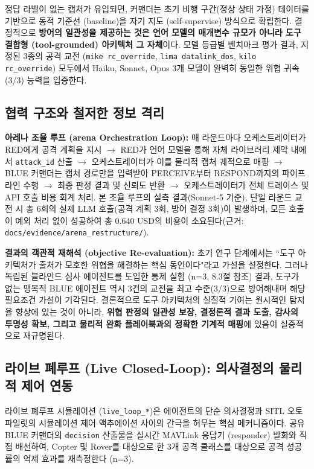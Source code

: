 정답 라벨이 없는 캡처가 유입되면, 커맨더는 초기 비행 구간(정상 상태 가정) 데이터를 기반으로 동적 기준선 (baseline)을 자기 지도 (self-supervise) 방식으로 확립한다. 결정적으로 \textbf{방어의 일관성을 제공하는 것은 언어 모델의 매개변수 규모가 아니라 도구 결합형 (tool-grounded) 아키텍처 그 자체}이다. 모델 등급별 벤치마크 평가 결과, 지정된 3종의 공격 교전 (\texttt{mike rc\_override}, \texttt{lima datalink\_dos}, \texttt{kilo rc\_override}) 모두에서 Haiku, Sonnet, Opus 3개 모델이 완벽히 동일한 위협 귀속 (3/3) 능력을 입증한다.

\subsection{협력 구조와 철저한 정보 격리}

\textbf{아레나 조율 루프 (arena Orchestration Loop):} 
매 라운드마다 오케스트레이터가 RED에게 공격 계획을 지시 $\rightarrow$ RED가 언어 모델을 통해 자체 라이브러리 제약 내에서 \texttt{attack\_id} 산출 $\rightarrow$ 오케스트레이터가 이를 물리적 캡처 궤적으로 매핑 $\rightarrow$ BLUE 커맨더는 캡처 경로만을 입력받아 PERCEIVE부터 RESPOND까지의 파이프라인 수행 $\rightarrow$ 최종 판정 결과 및 신뢰도 반환 $\rightarrow$ 오케스트레이터가 전체 트레이스 및 API 호출 비용 회계 처리.
본 조율 루프의 실측 결과(Sonnet-5 기준), 단일 라운드 교전 시 총 6회의 실제 LLM 호출(공격 계획 3회, 방어 결정 3회)이 발생하며, 모든 호출이 예외 처리 없이 성공하여 총 0.640 USD의 비용이 소요된다(근거: \texttt{docs/evidence/arena\_restructure/}).

\textbf{결과의 객관적 재해석 (objective Re-evaluation):}
초기 연구 단계에서는 ``도구 아키텍처가 출처가 모호한 위협을 해결하는 핵심 동인이다"라고 가설을 설정한다. 그러나 독립된 블라인드 심사 에이전트를 도입한 통제 실험 (n=3, 8.3절 참조) 결과, 도구가 없는 맹목적 BLUE 에이전트 역시 3건의 교전을 최고 수준(3/3)으로 방어해내며 해당 필요조건 가설이 기각된다. 결론적으로 도구 아키텍처의 실질적 기여는 원시적인 탐지율 향상에 있는 것이 아니라, \textbf{위협 판정의 일관성 보장, 결정론적 결과 도출, 감사의 투명성 확보, 그리고 물리적 완화 플레이북과의 정확한 기계적 매핑}에 있음이 실증적으로 재규명된다.

\subsection{라이브 폐루프 (Live Closed-Loop): 의사결정의 물리적 제어 연동}

라이브 폐루프 시뮬레이션 (\texttt{live\_loop\_*})은 에이전트의 단순 의사결정과 SITL 오토파일럿의 시뮬레이션 제어 액추에이션 사이의 간극을 허무는 핵심 메커니즘이다. 공유 BLUE 커맨더의 \texttt{decision} 산출물을 실시간 MAVLink 응답기 (responder) 발화와 직접 배선하여, Copter 및 Rover를 대상으로 한 3개 공격 클래스를 대상으로 공격 성공률의 억제 효과를 재측정한다 (n=3).

